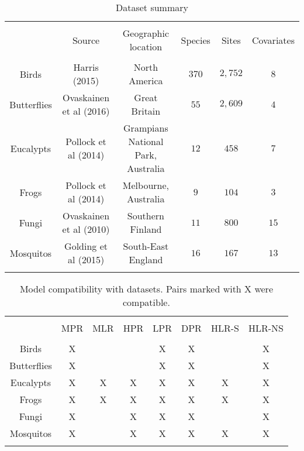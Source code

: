 \documentclass[a4paper]{article}
\begin{document}
\begin{table}[!htbp] 
  \caption{Dataset summary} 
  \label{} 
\begin{tabular}{@{\extracolsep{5pt}} cccccc} 
\\[-1.8ex]\hline 
\hline \\[-1.8ex] 
 & Source & Geographic location & Species & Sites & Covariates \\ 
\hline \\[-1.8ex] 
Birds & Harris (2015) & North America & $370$ & $2,752$ & $8$ \\ 
Butterflies & Ovaskainen et al (2016) & Great Britain & $55$ & $2,609$ & $4$ \\ 
Eucalypts & Pollock et al (2014) & Grampians National Park, Australia & $12$ & $458$ & $7$ \\ 
Frogs & Pollock et al (2014) & Melbourne, Australia & $9$ & $104$ & $3$ \\ 
Fungi & Ovaskainen et al (2010) & Southern Finland & $11$ & $800$ & $15$ \\ 
Mosquitos & Golding et al (2015) & South-East England & $16$ & $167$ & $13$ \\ 
\hline \\[-1.8ex] 
\end{tabular} 
\end{table} 


\begin{table}[!htbp] 
  \caption{Model compatibility with datasets. Pairs marked with X were compatible.} 
  \label{} 
\begin{tabular}{@{\extracolsep{5pt}} cccccccc} 
\\[-1.8ex]\hline 
\hline \\[-1.8ex] 
 & MPR & MLR & HPR & LPR & DPR & HLR-S & HLR-NS \\ 
\hline \\[-1.8ex] 
Birds & X &   &   & X & X &   & X \\ 
Butterflies & X &   &   & X & X &   & X \\ 
Eucalypts & X & X & X & X & X & X & X \\ 
Frogs & X & X & X & X & X & X & X \\ 
Fungi & X &   & X & X & X &   & X \\ 
Mosquitos & X &   & X & X & X & X & X \\ 
\hline \\[-1.8ex] 
\end{tabular} 
\end{table}
\end{document}
